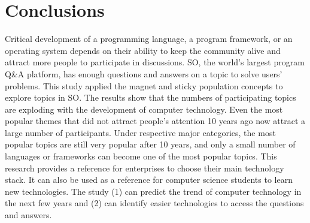 \documentclass[conference]{IEEEtran}
\begin{document}


\section{Conclusions}
Critical development of a programming language, a program framework, or an operating system depends on their ability to keep the community alive and attract more people to participate in discussions. SO, the world’s largest program Q\&A platform, has enough questions and answers on a topic to solve users’ problems. This study applied the magnet and sticky population concepts to explore topics in SO. The results show that the numbers of participating topics are exploding with the development of computer technology. Even the most popular themes that did not attract people’s attention 10 years ago now attract a large number of participants. Under respective major categories, the most popular topics are still very popular after 10 years, and only a small number of languages or frameworks can become one of the most popular topics. This research provides a reference for enterprises to choose their main technology stack. It can also be used as a reference for computer science students to learn new technologies. The study (1) can predict the trend of computer technology in the next few years and (2) can identify easier technologies to access the questions and answers.





\end{document}

